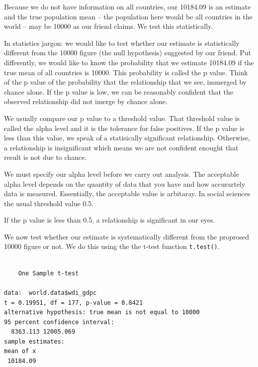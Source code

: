 \documentclass[]{article}
\newenvironment{Shaded}{\begin{snugshade}}{\end{snugshade}}
\newcommand{\DataTypeTok}[1]{\textcolor[rgb]{0.13,0.29,0.53}{#1}}
\newcommand{\DecValTok}[1]{\textcolor[rgb]{0.00,0.00,0.81}{#1}}
\newcommand{\KeywordTok}[1]{\textcolor[rgb]{0.13,0.29,0.53}{\textbf{#1}}}
\newcommand{\NormalTok}[1]{#1}
\newcommand{\OperatorTok}[1]{\textcolor[rgb]{0.81,0.36,0.00}{\textbf{#1}}}
\newcommand{\StringTok}[1]{\textcolor[rgb]{0.31,0.60,0.02}{#1}}
\begin{document}
Because we do not have information on all countries, our 10184.09 is an estimate and the true population mean -- the population here would be all countries in the world -- may be 10000 as our friend claims. We test this statistically.

In statistics jargon: we would like to test whether our estimate is statistically different from the 10000 figure (the null hypothesis) suggested by our friend. Put differently, we would like to know the probability that we estimate 10184.09 if the true mean of all countries is 10000. This probability is called the p value. Think of the p value of the probability that the relationship that we see, immerged by chance alone. If the p value is low, we can be reasonably confident that the observed relationship did not imerge by chance alone.

We usually compare our p value to a threshold value. That threshold value is called the alpha level and it is the tolerance for false positives. If the p value is less than this value, we speak of a statisically significant relationship. Otherwise, a relationship is insignificant which means we are not confident enought that result is not due to chance.

We must specify our alpha level before we carry out analysis. The acceptable alpha level depends on the quantity of data that you have and how accurartely data is measured. Essentially, the acceptable value is arbitaray. In social sciences the usual threshold value 0.5.

If the p value is less than 0.5, a relationship is significant in our eyes.

We now test whether our estimate is systematically different from the proprosed 10000 figure or not. We do this using the the t-test function \texttt{t.test()}.

\begin{Shaded}
\end{Shaded}

\begin{verbatim}

    One Sample t-test

data:  world.data$wdi_gdpc
t = 0.19951, df = 177, p-value = 0.8421
alternative hypothesis: true mean is not equal to 10000
95 percent confidence interval:
  8363.113 12005.069
sample estimates:
mean of x 
 10184.09 
\end{verbatim}
\end{document}
